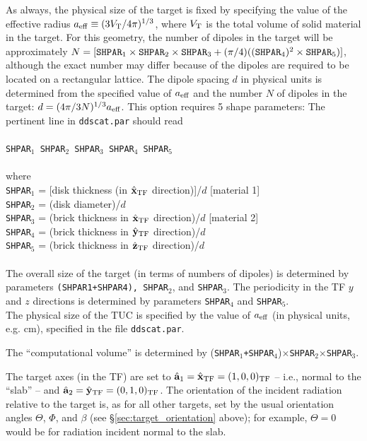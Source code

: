 	    As always, the physical size of the target is fixed by
	    specifying the value of the effective radius
	    ${a}_{\rm eff}\equiv(3V_{\rm T}/4\pi)^{1/3}$,
	    where $V_{\rm T}$ 
	    is the total volume of solid material in the target.
	    For this geometry, the number of dipoles in the target will
	    be approximately
	    $N=[{\tt SHPAR}_1\times{\tt SHPAR}_2\times{\tt SHPAR}_3 +
	    (\pi/4)(({\tt SHPAR}_4)^2\times{\tt SHPAR}_5)]$,
	    although the exact number may differ because of the
	    dipoles are required to be located on a rectangular lattice.
	    The dipole spacing $d$ in physical units
	    is determined from the specified value of ${a}_{\rm eff}$ and
	    the number $N$ of dipoles in the target:
	    $d=(4\pi/3N)^{1/3}{a}_{\rm eff}$.
	    This option requires 5 shape parameters:\newline
	    The pertinent line in {\tt ddscat.par} should read\\
	    \ \\
	{\tt SHPAR$_1$ SHPAR$_2$ SHPAR$_3$ SHPAR$_4$ SHPAR}$_5$\\
	    \ \\
	where\\
	{\tt SHPAR$_1$} = [disk thickness (in $\hat{\bf x}_{\rm TF}$ direction)]/$d$ 
        [material 1]\\
	{\tt SHPAR$_2$} = (disk diameter)/$d$\\
	{\tt SHPAR}$_3$ = (brick thickness in $\hat{\bf x}_{\rm TF}$ direction)/$d$ 
	[material 2]\\
	{\tt SHPAR}$_4$ = (brick thickness in $\hat{\bf y}_{\rm TF}$ direction)/$d$\\
	{\tt SHPAR}$_5$ = (brick thickness in $\hat{\bf z}_{\rm TF}$ direction)/$d$\\
	\ \\
	The overall size of the target (in terms of numbers of
	dipoles) is determined by parameters 
	{\tt (SHPAR1+SHPAR4), SHPAR$_2$}, and {\tt SHPAR}$_3$.
	The periodicity in the TF $y$ and $z$ directions is determined
	by parameters {\tt SHPAR}$_4$ and {\tt SHPAR}$_5$.\\
	The physical size of the TUC is specified by the value of
	${a}_{\rm eff}$ (in physical units, e.g. cm), 
	specified in the file {\tt ddscat.par}.

	The ``computational volume'' is determined by
	({\tt SHPAR$_1$+SHPAR}$_4$)$\times${\tt SHPAR$_2$}$\times${\tt SHPAR}$_3$.

	The target axes (in the TF) 
	are set to ${\hat{\bf a}}_1 = \hat{\bf x}_{\rm TF} = (1,0,0)_{\rm TF}$ --
	i.e., normal to the ``slab'' -- and
	${\hat{\bf a}}_2 = \hat{\bf y}_{\rm TF}= (0,1,0)_{\rm TF}$.
	The orientation of the incident radiation relative to the target
	is, as for all other targets, set by the usual orientation
	angles  $\Theta$, $\Phi$, and $\beta$ 
	(see \S\ref{sec:target_orientation} above); for example,
	$\Theta=0$ would be for radiation incident normal to the slab.

